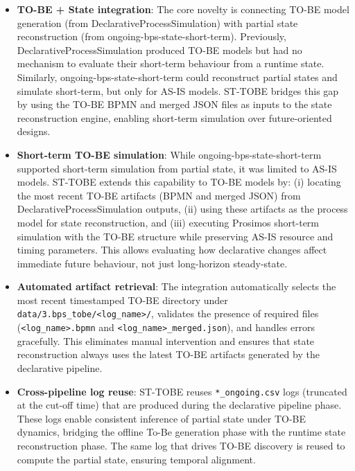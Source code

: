 \documentclass[a4paper,fleqn]{cas-sc}
\begin{document}
\begin{itemize}
  \item \textbf{TO-BE + State integration}: The core novelty is connecting TO-BE model generation
  (from DeclarativeProcessSimulation) with partial state reconstruction (from ongoing-bps-state-short-term).
  Previously, DeclarativeProcessSimulation produced TO-BE models but had no mechanism to evaluate
  their short-term behaviour from a runtime state. Similarly, ongoing-bps-state-short-term could
  reconstruct partial states and simulate short-term, but only for AS-IS models. ST-TOBE bridges
  this gap by using the TO-BE BPMN and merged JSON files as inputs to the state reconstruction engine,
  enabling short-term simulation over future-oriented designs.
  
  \item \textbf{Short-term TO-BE simulation}: While ongoing-bps-state-short-term supported short-term
  simulation from partial state, it was limited to AS-IS models. ST-TOBE extends this capability to
  TO-BE models by: (i) locating the most recent TO-BE artifacts (BPMN and merged JSON) from
  DeclarativeProcessSimulation outputs, (ii) using these artifacts as the process model for state
  reconstruction, and (iii) executing Prosimos short-term simulation with the TO-BE structure while
  preserving AS-IS resource and timing parameters. This allows evaluating how declarative changes
  affect immediate future behaviour, not just long-horizon steady-state.
  
  \item \textbf{Automated artifact retrieval}: The integration automatically selects the most recent
  timestamped TO-BE directory under \verb|data/3.bps_tobe/<log_name>/|, validates the presence of
  required files (\verb|<log_name>.bpmn| and \verb|<log_name>_merged.json|), and handles errors
  gracefully. This eliminates manual intervention and ensures that state reconstruction always uses
  the latest TO-BE artifacts generated by the declarative pipeline.
  
  \item \textbf{Cross-pipeline log reuse}: ST-TOBE reuses \verb|*_ongoing.csv| logs (truncated at
  the cut-off time) that are produced during the declarative pipeline phase. These logs enable
  consistent inference of partial state under TO-BE dynamics, bridging the offline To-Be generation
  phase with the runtime state reconstruction phase. The same log that drives TO-BE discovery is
  reused to compute the partial state, ensuring temporal alignment.
  

\end{itemize}
\end{document}
